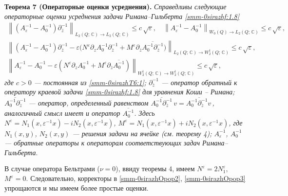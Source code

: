 \documentclass[a4paper,12pt]{article}
\theoremstyle{definition}
\begin{document}
\smallskip



\smallskip
\textbf{Теорема 7 (Операторные оценки  усреднения).}
{\it Справедливы следующие операторные оценки усреднения задачи Римана--Гильберта \eqref{smm-0sirazhf:1.8}
	\begin{gather}\label{smm-0sirazhOpop1}
		\left\|\left(A_\varepsilon^{-1}-A_0^{-1}\right)\partial_{\overline z}^{-1}\right\|_{L_2(Q;\,\mathbb{C})\to L_2(Q;\,\mathbb{C})}
		\leq c\,\sqrt\varepsilon,\quad
		\left\|A_\varepsilon^{-1}-A_0^{-1}\right\|_{W_0(Q)\to L_2(Q;\,\mathbb{C})}
		\leq c\,\sqrt\varepsilon,\\\label{smm-0sirazhOpop2}
		\left\|\left(A_\varepsilon^{-1}-A_0^{-1}\right)\partial_{\overline z}^{-1}-\varepsilon\Big(N^\varepsilon
		\partial_zA_0^{-1}
		\partial_{\overline z}^{-1}\right.
		+\left.M^\varepsilon\partial_{\overline z}\overline{A_0^{-1}\partial_{\overline z}^{-1}}\Big)
		\right\|_{L_2(Q;\,\mathbb{C})\to W^1_2(Q;\,\mathbb{C})}
		\leq c\,\sqrt\varepsilon,\\\label{smm-0sirazhOpop3}
		\left\|A_\varepsilon^{-1}-A_0^{-1}-\varepsilon\left(N^\varepsilon\partial_zA_0^{-1}
		+M^\varepsilon\partial_{\overline z}\overline{A_0^{-1}}\right)
		\right\|_{W^1_2(Q;\,\mathbb{C})\to W^1_2(Q;\,\mathbb{C})}
		\leq c\,\sqrt\varepsilon,
	\end{gather}
	где $c>0$ --- постоянная из \eqref{smm-0sirazhT6:1}; $\partial_{\overline z}^{-1}$ --- оператор обратный к
	оператору краевой задачи
	\eqref{smm-0sirazhf:1.8} для уравнения Коши -- Римана;
	$\overline{A_0^{-1}\partial_{\overline z}^{-1}}$ --- оператор,
	определенный равенством $\overline{A_0^{-1}\partial_{\overline z}^{-1}}{\,v}=\overline{A_0^{-1}\partial_{\overline z}^{-1}{v\,}}$,
	аналогичный смысл имеет и оператор $\overline{A_0^{-1}}$. Здесь
	$N^\varepsilon=N_1(x,\varepsilon^{-1}x)-iN_2(x,\varepsilon^{-1}x)$, $M^\varepsilon=N_1(x,\varepsilon^{-1}x)+iN_2(x,\varepsilon^{-1}x)$,  где $N_1(x,y)$, $N_2(x,y)$ --- решения задачи
	на ячейке (см. теорему 4); $A_\varepsilon^{-1}$, $A_0^{-1}$
	--- обратные операторы к операторам соответствующих  задач Римана--Гильберта}.


В случае оператора Бельтрами ($\nu=0$), ввиду теоремы 4, имеем
$N^\varepsilon=2N_1^\varepsilon$, $M^\varepsilon=0$. Следовательно, корректоры в \eqref{smm-0sirazhOpop2}, \eqref{smm-0sirazhOpop3} упрощаются
и мы имеем более простые оценки.
\end{document}
